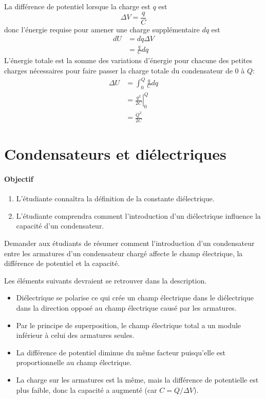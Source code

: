 La différence de potentiel lorsque la charge est $q$ est
$$\Delta V = \frac{q}{C}$$
donc l'énergie requise pour amener une charge supplémentaire $dq$ est
\begin{align*}
  dU &= dq \Delta V \\
           &= \frac{q}{C} dq
\end{align*}
L'énergie totale est la somme des variations d'énergie pour chacune des petites
charges nécessaires pour faire passer la charge totale du condensateur de $0$ à
$Q$:
\begin{align*}
  \Delta U &= \int_0^Q \frac{q}{C} dq \\
           &= \left. \frac{q^2}{2C} \right|_0^Q \\
           &= \frac{Q^2}{2C}
\end{align*}


\sectionline


\section{Condensateurs et diélectriques}


\paragraph{Objectif}

\begin{enumerate}
  \item L'étudiante connaîtra la définition de la constante diélectrique.
  \item L'étudiante comprendra comment l'introduction d'un diélectrique
    influence la capacité d'un condensateur.
\end{enumerate}


Demander aux étudiants de résumer comment l'introduction d'un condensateur
entre les armatures d'un condensateur chargé affecte le champ électrique, la
différence de potentiel et la capacité.

Les éléments suivants devraient se retrouver dans la description.

\begin{itemize}
  \item Diélectrique se polarise ce qui crée un champ électrique dans le
    diélectrique dans la direction opposé au champ électrique causé par les
    armatures.
  \item Par le principe de superposition, le champ électrique total a un module
    inférieur à celui des armatures seules.
  \item La différence de potentiel diminue du même facteur puisqu'elle est
    proportionnelle au champ électrique.
  \item La charge sur les armatures est la même, mais la différence de
    potentielle est plus faible, donc la capacité a augmenté (car $C = Q/\Delta
    V$).
\end{itemize}


